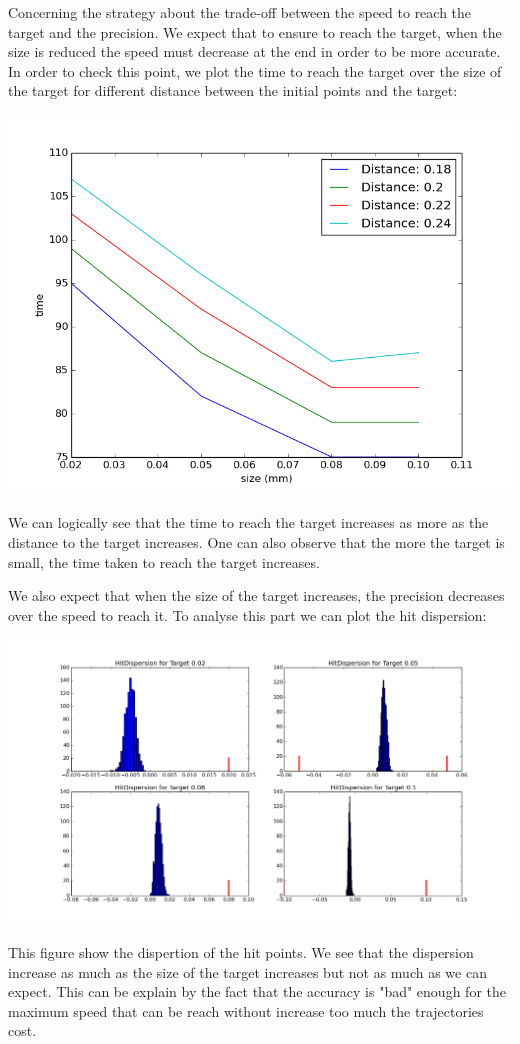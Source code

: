 \documentclass[pdftex,a4paper,11pt]{report}
\begin{document}
Concerning the strategy about the trade-off between the speed to reach the target and the precision. We expect that to ensure to reach the target, when the size is reduced the speed must decrease at the end in order to be more accurate.
In order to check this point, we plot the time to reach the target over the size of the target for different distance between the initial points and the target:
\begin{center}
\includegraphics[scale=0.5]{figures/timeDistance.png}
\end{center}
We can logically see that the time to reach the target increases as more as the distance to the target increases.
One can also observe that the more the target is small, the time taken to reach the target increases.

We also expect that when the size of the target increases, the precision decreases over the speed to reach it.
To analyse this part we can plot the hit dispersion:
\begin{center}
\includegraphics[scale=0.3]{figures/hitDispAll0p1_0p4175.png}
\end{center}
This figure show the dispertion of the hit points. We see that the dispersion increase as much as the size of the target increases but not as much as we can expect.
This can be explain by the fact that the accuracy is "bad" enough for the maximum speed that can be reach without increase too much the trajectories cost.
\end{document}
